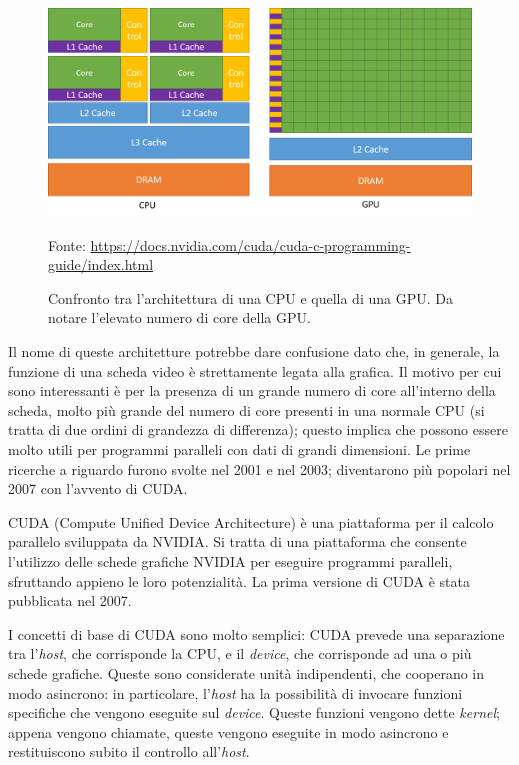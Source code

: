 \documentclass[12pt,a4paper,openright,twoside]{report}
\newcommand{\source}[1]{\caption*{\hfill \scriptsize Fonte: {#1}} }
\begin{document}
\begin{figure}[h]
    \centering
    \includegraphics[width=\textwidth]{cpu-gpu-comparison.png}
    \source{\url{https://docs.nvidia.com/cuda/cuda-c-programming-guide/index.html}}
    \caption[Confronto tra CPU e GPU]{Confronto tra l'architettura di una CPU e quella di una GPU. Da notare l'elevato numero di core della GPU.}
    \label{img:cpu-gpu-comparison}
\end{figure}

Il nome di queste architetture potrebbe dare confusione dato che, in generale, la funzione di una scheda video è strettamente legata alla grafica. Il motivo per cui sono interessanti è per la presenza di un grande numero di core all'interno della scheda, molto più grande del numero di core presenti in una normale CPU (si tratta di due ordini di grandezza di differenza); questo implica che possono essere molto utili per programmi paralleli con dati di grandi dimensioni. Le prime ricerche a riguardo furono svolte nel 2001 e nel 2003; diventarono più popolari nel 2007 con l'avvento di CUDA.

CUDA (Compute Unified Device Architecture) è una piattaforma per il calcolo parallelo sviluppata da NVIDIA. Si tratta di una piattaforma che consente l'utilizzo delle schede grafiche NVIDIA per eseguire programmi paralleli, sfruttando appieno le loro potenzialità. La prima versione di CUDA è stata pubblicata nel 2007.

I concetti di base di CUDA sono molto semplici: CUDA prevede una separazione tra l'\textit{host}, che corrisponde la CPU, e il \textit{device}, che corrisponde ad una o più schede grafiche. Queste sono considerate unità indipendenti, che cooperano in modo asincrono: in particolare, l'\textit{host} ha la possibilità di invocare funzioni specifiche che vengono eseguite sul \textit{device}. Queste funzioni vengono dette \textit{kernel}; appena vengono chiamate, queste vengono eseguite in modo asincrono e restituiscono subito il controllo all'\textit{host}.
\end{document}
